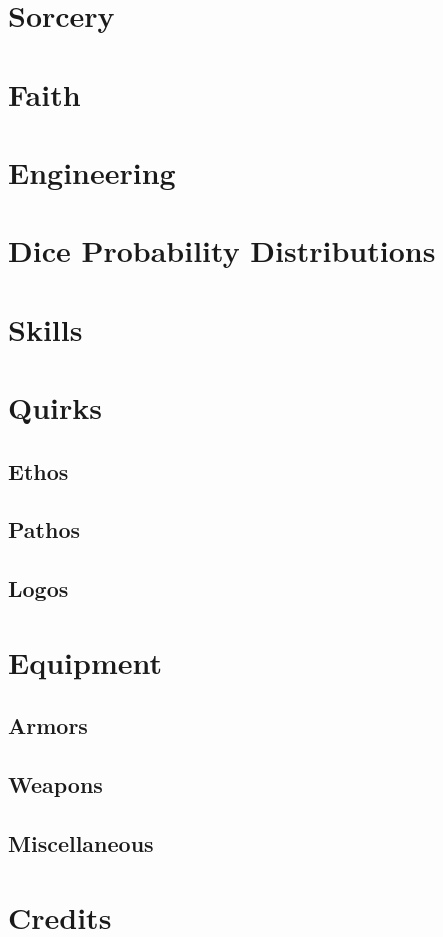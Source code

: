 \documentclass{book}
\begin{document}
    \chapter{Sorcery}

    \chapter{Faith}

    \chapter{Engineering}

    \begin{appendices}

        \chapter{Dice Probability Distributions}

        \chapter{Skills}

        \chapter{Quirks}
            \section{Ethos}
            \section{Pathos}
            \section{Logos}

        \chapter{Equipment}
            \section{Armors}
            \section{Weapons}
            \section{Miscellaneous}

    \end{appendices}

    \chapter*{Credits}
    
\end{document}
